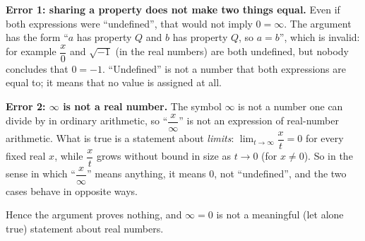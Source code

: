 \textbf{Error 1: sharing a property does not make two things equal.} Even if both expressions were ``undefined'', that would not imply $0=\infty$. The argument has the form ``$a$ has property $Q$ and $b$ has property $Q$, so $a=b$'', which is invalid: for example $\dfrac{x}{0}$ and $\sqrt{-1}$ (in the real numbers) are both undefined, but nobody concludes that $0=-1$. ``Undefined'' is not a number that both expressions are equal to; it means that no value is assigned at all.

\textbf{Error 2: $\infty$ is not a real number.} The symbol $\infty$ is not a number one can divide by in ordinary arithmetic, so ``$\dfrac{x}{\infty}$'' is not an expression of real-number arithmetic. What is true is a statement about \emph{limits}: $\lim_{t\to\infty}\dfrac{x}{t}=0$ for every fixed real $x$, while $\dfrac{x}{t}$ grows without bound in size as $t\to0$ (for $x\ne0$). So in the sense in which ``$\dfrac{x}{\infty}$'' means anything, it means $0$, not ``undefined'', and the two cases behave in opposite ways.

Hence the argument proves nothing, and $\infty=0$ is not a meaningful (let alone true) statement about real numbers.
